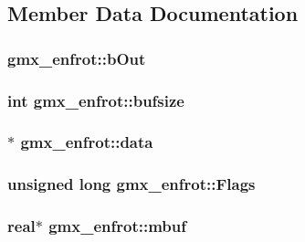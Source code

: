 \subsection{\-Member \-Data \-Documentation}
\hypertarget{structgmx__enfrot_a4e3ff7c84133b7194fd78b91d158a545}{
\subsubsection[{b\-Out}]{ {\bf gmx\-\_\-enfrot\-::b\-Out}}}\label{structgmx__enfrot_a4e3ff7c84133b7194fd78b91d158a545}
\hypertarget{structgmx__enfrot_a7b99109d5925ba567701673220ad1aef}{
\subsubsection[{bufsize}]{\setlength{\rightskip}{0pt plus 5cm}int {\bf gmx\-\_\-enfrot\-::bufsize}}}\label{structgmx__enfrot_a7b99109d5925ba567701673220ad1aef}
\hypertarget{structgmx__enfrot_a4d844be7781692509b1055a4955bd295}{
\subsubsection[{data}]{$\ast$ {\bf gmx\-\_\-enfrot\-::data}}}\label{structgmx__enfrot_a4d844be7781692509b1055a4955bd295}
\hypertarget{structgmx__enfrot_a35fb9deb5a48a126d4a4ee1b49a56233}{
\subsubsection[{\-Flags}]{\setlength{\rightskip}{0pt plus 5cm}unsigned long {\bf gmx\-\_\-enfrot\-::\-Flags}}}\label{structgmx__enfrot_a35fb9deb5a48a126d4a4ee1b49a56233}
\hypertarget{structgmx__enfrot_a2990ae02444ac6f81b92d434ca4dfb62}{
\subsubsection[{mbuf}]{\setlength{\rightskip}{0pt plus 5cm}real$\ast$ {\bf gmx\-\_\-enfrot\-::mbuf}}}\label{structgmx__enfrot_a2990ae02444ac6f81b92d434ca4dfb62}
